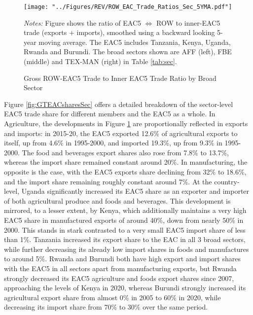 \documentclass[a4paper]{article}
\begin{document}
\begin{figure}[h!]
\centering
\caption{\label{fig:EAC_ROW_Ratios_Sec} Gross ROW-EAC5 Trade to Inner EAC5 Trade Ratio by Broad Sector}
\texttt{[image: "../Figures/REV/ROW\_EAC\_Trade\_Ratios\_Sec\_5YMA.pdf"]}
\raggedright
\scriptsize 
\emph{Notes:} Figure shows the ratio of EAC5 $\Leftrightarrow$ ROW to inner-EAC5 trade (exports + imports), smoothed using a backward looking 5-year moving average. The EAC5 includes Tanzania, Kenya, Uganda, Rwanda and Burundi. The broad sectors shown are AFF (left), FBE (middle) and TEX-MAN (right) in Table \ref{tab:sec}.
\end{figure}

\newpage

Figure \ref{fig:GTEACsharesSec} offers a detailed breakdown of the sector-level EAC5 trade share for different members and the EAC5 as a whole. In Agriculture, the developments in Figure \ref{fig:EAC_ROW_Ratios_Sec} are proportionally reflected in exports and imports: in 2015-20, the EAC5 exported 12.6\% of agricultural exports to itself, up from 4.6\% in 1995-2000, and imported 19.3\%, up from 9.3\% in 1995-2000. The food and beverages export shares also rose from 7.8\% to 13.7\%, whereas the import share remained constant around 20\%. In manufacturing, the opposite is the case, with the EAC5 exports share declining from 32\% to 18.6\%, and the import share remaining roughly constant around 7\%. At the country-level, Uganda significantly increased its EAC5 share as an exporter and importer of both agricultural produce and foods and beverages. This development is mirrored, to a lesser extent, by Kenya, which additionally maintains a very high EAC5 share in manufactured exports of around 40\%, down from nearly 50\% in 2000. This stands in stark contrasted to a very small EAC5 import share of less than 1\%. Tanzania increased its export share to the EAC in all 3 broad sectors, while further decreasing its already low import shares in foods and manufactures to around 5\%. Rwanda and Burundi both have high export and import shares with the EAC5 in all sectors apart from manufacturing exports, but Rwanda strongly decreased its EAC5 agriculture and foods export shares since 2007, approaching the levels of Kenya in 2020, whereas Burundi strongly increased its agricultural export share from almost 0\% in 2005 to 60\% in 2020, while decreasing its import share from 70\% to 30\% over the same period. \newline 
\end{document}
